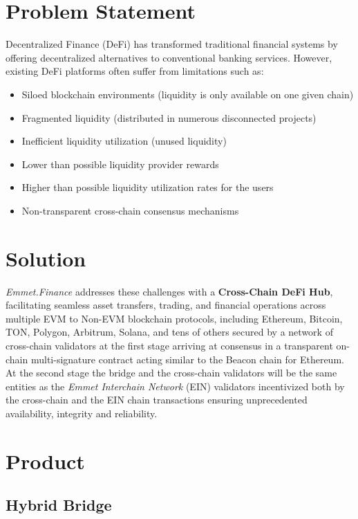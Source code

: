 \documentclass[12pt, a4paper]{article}
\begin{document}
\section{Problem Statement}

Decentralized Finance (DeFi) has transformed traditional financial systems by offering decentralized alternatives to conventional banking services. However, existing DeFi platforms often suffer from limitations such as: 

\begin{itemize}
    \item Siloed blockchain environments (liquidity is only available on one given chain)
    \item Fragmented liquidity (distributed in numerous disconnected projects)
    \item Inefficient liquidity utilization (unused liquidity)
    \item Lower than possible liquidity provider rewards
    \item Higher than possible liquidity utilization rates for the users
    \item Non-transparent cross-chain consensus mechanisms
\end{itemize}

\section{Solution}

\textit{Emmet.Finance} addresses these challenges with a \textbf{Cross-Chain DeFi Hub}, facilitating seamless asset transfers, trading, and financial operations across multiple EVM to Non-EVM blockchain protocols, including Ethereum, Bitcoin, TON, Polygon, Arbitrum, Solana, and tens of others secured by a network of cross-chain validators at the first stage arriving at consensus in a transparent on-chain multi-signature contract acting similar to the Beacon chain for Ethereum. At the second stage the bridge and the cross-chain validators will be the same entities as the \textit{Emmet Interchain Network} (EIN) validators incentivized both by the cross-chain and the EIN chain transactions ensuring unprecedented availability, integrity and reliability.

\section{Product}

\subsection{Hybrid Bridge}
\end{document}
